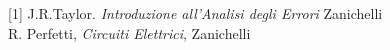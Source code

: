 [1] J.R.Taylor. \emph{Introduzione all’Analisi degli Errori} Zanichelli \\
[2] R. Perfetti, \emph{Circuiti Elettrici}, Zanichelli